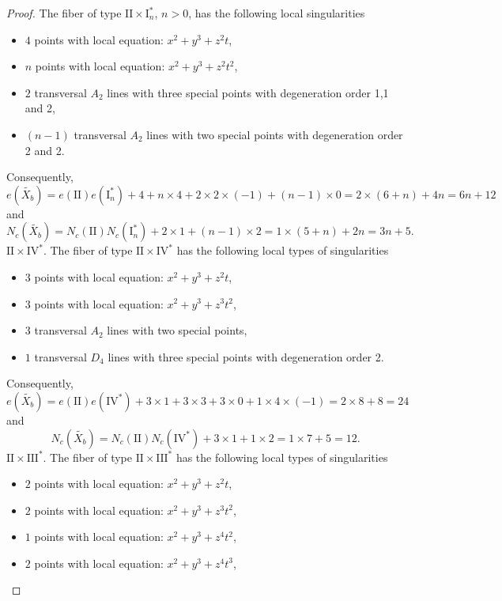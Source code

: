 \documentclass[a4paper]{amsart}
\theoremstyle{plain}
\theoremstyle{definition}
\theoremstyle{remark}
\numberwithin{equation}{section}
\begin{document}
\begin{proof}
The fiber of type $\mathrm{II} \times \mathrm{I}_{n}^{*}$, $n>0$, has the following local singularities
\begin{itemize}
	\item [] $4$ points with local equation: $x^{2}+y^{3}+z^{2}t$,
	\item [] $n$ points with local equation: $x^{2}+y^{3}+z^{2}t^{2}$,
	\item [] $2$ transversal $A_{2}$ lines with three  special points with degeneration order 1,1 and 2,
	\item [] $(n-1)$ transversal $A_{2}$ lines with two special points with degeneration order 2 and 2.
\end{itemize}
Consequently,
\[
e(\widetilde{X_{b}}) = e(\mathrm{II})e(\mathrm{I}_{n}^{*}) + 4 + n\times4 +2 \times 2\times (-1) + (n-1)\times 0 = 2\times (6+n) + 4n =6n + 12
\]
and
\[
N_{c}(\widetilde{X_{b}}) = N_{c}(\mathrm{II})N_{c}(\mathrm{I}_{n}^{*}) +  2\times 1 + (n-1) \times 2 = 1\times (5 + n) + 2n = 3n+5.
\]
\medskip
\noindent\emph{$\mathrm{II} \times \mathrm{IV}^{*}$}.
The fiber of type $\mathrm{II} \times \mathrm{IV}^{*}$ has the following local types of singularities
\begin{itemize}
	\item [] $3$ points with local equation: $x^{2}+y^{3}+z^{2}t$,
	\item [] $3$ points with local equation: $x^{2}+y^{3}+z^{3}t^{2}$,
	\item [] $3$ transversal $A_{2}$ lines with two special points,
	\item [] $1$ transversal $D_{4}$ lines with three special points with degeneration order 2.
\end{itemize}
Consequently,
\[
e(\widetilde{X_{b}}) = e(\mathrm{II})e(\mathrm{IV}^{*}) + 3\times1 + 3 \times 3 + 3\times 0 + 1\times 4 \times (-1) =
2\times 8 + 8 = 24
\]
and
\[
N_{c}(\widetilde{X_{b}}) = N_{c}(\mathrm{II})N_{c}(\mathrm{IV}^{*}) +  3\times 1 +  1 \times 2 = 1\times 7 + 5 = 12.
\]
\medskip
\noindent\emph{$\mathrm{II} \times \mathrm{III}^*$}.
The fiber of type $\mathrm{II} \times \mathrm{III}^{*}$ has the following local types of singularities
\begin{itemize}
	\item [] $2$ points with local equation: $x^{2}+y^{3}+z^{2}t$,
	\item [] $2$ points with local equation: $x^{2}+y^{3}+z^{3}t^{2}$,
	\item [] $1$ points with local equation: $x^{2}+y^{3}+z^{4}t^{2}$,
	\item [] $2$ points with local equation: $x^{2}+y^{3}+z^{4}t^{3}$,

\end{itemize}
\end{proof}
\end{document}
